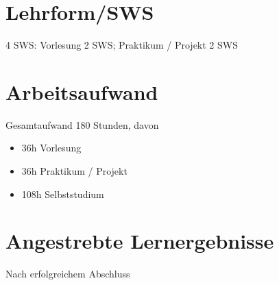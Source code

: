 \section*{Lehrform/SWS\label{/mi-2017/modulbeschreibungen-master/MA_VC_Modul_BildbasierteComputergrafik}}\label{lehrformswspathlabelmi-2017modulbeschreibungen-mastermaux5fvcux5fmodulux5fbildbasiertecomputergrafik}

4 SWS: Vorlesung 2 SWS; Praktikum / Projekt 2 SWS

\section*{Arbeitsaufwand\label{/mi-2017/modulbeschreibungen-master/MA_VC_Modul_BildbasierteComputergrafik}}\label{arbeitsaufwandpathlabelmi-2017modulbeschreibungen-mastermaux5fvcux5fmodulux5fbildbasiertecomputergrafik}

Gesamtaufwand 180 Stunden, davon

\begin{itemize}
\tightlist
\item
  36h Vorlesung
\item
  36h Praktikum / Projekt
\item
  108h Selbststudium
\end{itemize}

\section*{Angestrebte
Lernergebnisse\label{/mi-2017/modulbeschreibungen-master/MA_VC_Modul_BildbasierteComputergrafik}}\label{angestrebte-lernergebnissepathlabelmi-2017modulbeschreibungen-mastermaux5fvcux5fmodulux5fbildbasiertecomputergrafik}

Nach erfolgreichem Abschluss

